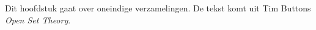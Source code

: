 \documentclass[openany]{memoir}
\begin{document}
\begingroup
\def\olfilename{OLP-0049}
\def\olfilepath{content/sets-functions-relations/infinite/}
\hypertarget{unit-OLP-0049}{}




\begin{editorial}
Dit hoofdstuk gaat over oneindige verzamelingen. De tekst komt uit Tim
Buttons \emph{Open Set Theory}.
\end{editorial}
\endgroup

\begingroup
\def\olfilename{OLP-0050}
\def\olfilepath{content/sets-functions-relations/infinite/}
\hypertarget{unit-OLP-0050}{}
%


\end{document}
